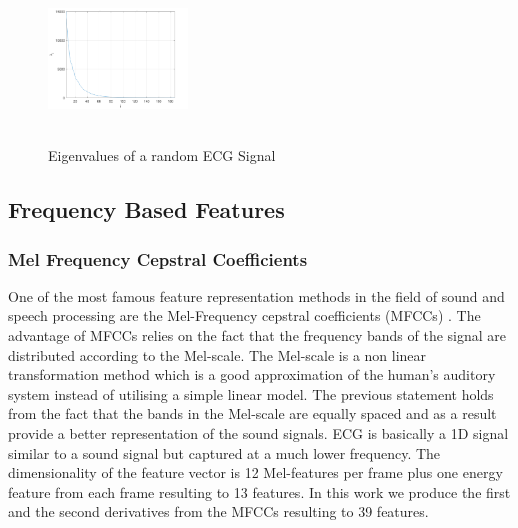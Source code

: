 \documentclass[a4paper,10pt,twocolumn]{article}
\begin{document}
\begin{figure}[ht]
     \centering
     \includegraphics[width=0.33\textwidth, height=125pt]{images/eigenvalues15.png}
      \caption{Eigenvalues of a random ECG Signal} 
      \label{fig:eigenvalues}
\end{figure}


\subsection{Frequency Based Features}
\subsubsection{Mel Frequency Cepstral Coefficients}
One of the most famous feature representation methods in the field of sound and speech processing are the Mel-Frequency cepstral coefficients (MFCCs) \cite{mel_book}. The advantage of MFCCs relies on the fact that the frequency bands of the signal are distributed according to the Mel-scale. The Mel-scale is a non linear transformation method which is a good approximation of the human's auditory system instead of utilising a simple linear  model. The previous statement holds from the fact that the bands in the Mel-scale are equally spaced and as a result provide a better representation of the sound signals. ECG is basically a 1D signal similar to a sound signal but captured at a much lower frequency. %
The dimensionality of the feature vector is 12 Mel-features per frame plus one energy feature from each frame resulting to 13 features. In this work we produce the first and the second derivatives from the MFCCs resulting to 39 features.
\end{document}
